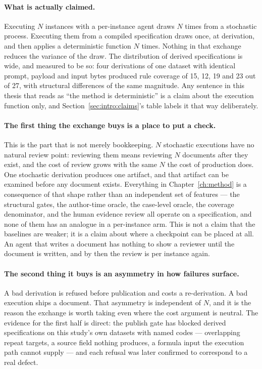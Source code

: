 \paragraph{What is actually claimed.}
Executing $N$ instances with a per-instance agent draws $N$ times from a stochastic process.
Executing them from a compiled specification draws once, at derivation, and then applies a
deterministic function $N$ times. Nothing in that exchange reduces the variance of the draw.
The distribution of derived specifications is wide, and measured to be so: four derivations of
one dataset with identical prompt, payload and input bytes produced rule coverage of 15, 12, 19
and 23 out of 27, with structural differences of the same magnitude. Any sentence in this thesis
that reads as ``the method is deterministic'' is a claim about the execution function only, and
Section~\ref{sec:intro:claims}'s table labels it that way deliberately.

\paragraph{The first thing the exchange buys is a place to put a check.}
This is the part that is not merely bookkeeping. $N$ stochastic executions have no natural
review point: reviewing them means reviewing $N$ documents after they exist, and the cost of
review grows with the same $N$ the cost of production does. One stochastic derivation produces
one artifact, and that artifact can be examined before any document exists. Everything in
Chapter~\ref{ch:method} is a consequence of that shape rather than an independent set of
features --- the structural gates, the author-time oracle, the case-level oracle, the coverage
denominator, and the human evidence review all operate on a specification, and none of them has
an analogue in a per-instance arm. This is not a claim that the baselines are weaker; it is a
claim about where a checkpoint can be placed at all. An agent that writes a document has nothing
to show a reviewer until the document is written, and by then the review is per instance again.

\paragraph{The second thing it buys is an asymmetry in how failures surface.}
A bad derivation is refused before publication and costs a re-derivation. A bad execution ships
a document. That asymmetry is independent of $N$, and it is the reason the exchange is worth
taking even where the cost argument is neutral. The evidence for the first half is direct: the
publish gate has blocked derived specifications on this study's own datasets with named codes
--- overlapping repeat targets, a source field nothing produces, a formula input the execution
path cannot supply --- and each refusal was later confirmed to correspond to a real defect.

